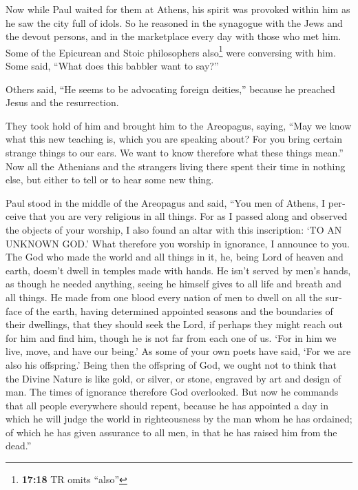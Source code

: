 \begin{paracol}{2}
\begin{otherlanguage}{english}
 Now while Paul waited for them at Athens, his spirit was
provoked within him as he saw the city full of idols.  So
he reasoned in the synagogue with the Jews and the devout persons, and
in the marketplace every day with those who met him. 
Some of the Epicurean and Stoic philosophers also\footnote{\textbf{17:18}
  TR omits ``also''} were conversing with him. Some said, ``What does
this babbler want to say?''

Others said, ``He seems to be advocating foreign deities,'' because he
preached Jesus and the resurrection.

 They took hold of him and brought him to the Areopagus,
saying, ``May we know what this new teaching is, which you are speaking
about?  For you bring certain strange things to our ears.
We want to know therefore what these things mean.''  Now
all the Athenians and the strangers living there spent their time in
nothing else, but either to tell or to hear some new thing.

 Paul stood in the middle of the Areopagus and said,
``You men of Athens, I perceive that you are very religious in all
things.  For as I passed along and observed the objects
of your worship, I also found an altar with this inscription: `TO AN
UNKNOWN GOD.' What therefore you worship in ignorance, I announce to
you.  The God who made the world and all things in it,
he, being Lord of heaven and earth, doesn't dwell in temples made with
hands.  He isn't served by men's hands, as though he
needed anything, seeing he himself gives to all life and breath and all
things.  He made from one blood every nation of men to
dwell on all the surface of the earth, having determined appointed
seasons and the boundaries of their dwellings,  that they
should seek the Lord, if perhaps they might reach out for him and find
him, though he is not far from each one of us.  `For in
him we live, move, and have our being.' As some of your own poets have
said, `For we are also his offspring.'  Being then the
offspring of God, we ought not to think that the Divine Nature is like
gold, or silver, or stone, engraved by art and design of man.
 The times of ignorance therefore God overlooked. But now
he commands that all people everywhere should repent, 
because he has appointed a day in which he will judge the world in
righteousness by the man whom he has ordained; of which he has given
assurance to all men, in that he has raised him from the dead.''


\end{otherlanguage}
\end{paracol}
